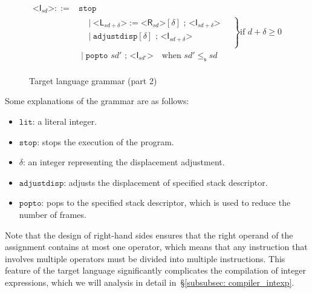 \documentclass[12pt,a4paper]{report}
\theoremstyle{definition}
\newcommand{\secref}[1]{\S\ref{#1}}
\newcommand{\bracket}[1]{\mathord{<} #1 \mathord{>}}
\begin{document}
    \begin{figure}[H]
        \centering
        \[\begin{aligned}
            \bracket{\textsf{I}_{\textit{sd}}} ::={}& \texttt{stop} \\
                            &\left.
                            \begin{aligned}
                            &|{\ } \bracket{\textsf{L}_{\textit{sd}+\delta}} := \bracket{\textsf{R}_{\textit{sd}}}[\delta] \text{ ; } \bracket{\textsf{I}_{\textit{sd}+\delta}} \\
                            &|{\ } \texttt{adjustdisp} [\delta] \text{ ; } \bracket{\textsf{I}_{\textit{sd}+\delta}} \\
                            \end{aligned}
                            \quad \right\} \text{if } d + \delta \geq 0  \\
                            &{}\mid{} \texttt{popto } \textit{sd′} \text{ ; } \bracket{\textsf{I}_{\textit{sd′}}} \quad \text{when } \textit{sd′} \leq_\mathsf{s} \textit{sd} \\
        \end{aligned}\]
        \caption{Target language grammar (part 2)}
        \label{fig: target_grammar_2}
    \end{figure}
    Some explanations of the grammar are as follows:
    \begin{itemize}
        \item 
            $\texttt{lit}$: a literal integer.
        \item 
            $\texttt{stop}$: stops the execution of the program.
        \item 
            $\delta$: an integer representing the displacement adjustment.
        \item 
            $\texttt{adjustdisp}$: adjusts the displacement of specified stack descriptor.
        \item 
            $\texttt{popto}$: pops to the specified stack descriptor, which is used to reduce the number of frames.
    \end{itemize}
    Note that the design of right-hand sides ensures that the right operand of the assignment contains at most one operator, which means that any instruction that involves multiple operators must be divided into multiple instructions. This feature of the target language significantly complicates the compilation of integer expressions, which we will analysis in detail in~\secref{subsubsec: compiler_intexp}.
\end{document}
